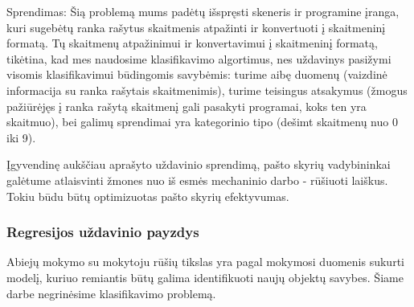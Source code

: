 Sprendimas: Šią problemą mums padėtų išspręsti skeneris ir programine įranga,
kuri sugebėtų ranka rašytus skaitmenis atpažinti ir konvertuoti į skaitmeninį
formatą. Tų skaitmenų atpažinimui ir konvertavimui į skaitmeninį formatą,
tikėtina, kad mes naudosime klasifikavimo algortimus, nes uždavinys pasižymi
visomis klasifikavimui būdingomis savybėmis: turime aibę duomenų (vaizdinė
informacija su ranka rašytais skaitmenimis), turime teisingus atsakymus (žmogus
pažiūrėjęs į ranka rašytą skaitmenį gali pasakyti programai, koks ten yra
skaitmuo), bei galimų sprendimai yra kategorinio tipo (dešimt skaitmenų nuo
0 iki 9).

Įgyvendinę aukščiau aprašyto uždavinio sprendimą, pašto skyrių vadybininkai
galėtume atlaisvinti žmones nuo iš esmės mechaninio darbo - rūšiuoti laiškus.
Tokiu būdu būtų optimizuotas pašto skyrių efektyvumas.

\subsubsection{Regresijos uždavinio payzdys}



Abiejų mokymo su mokytoju rūšių tikslas yra pagal mokymosi duomenis sukurti
modelį, kuriuo remiantis būtų galima identifikuoti naujų objektų
savybes.\cite{markhall99} Šiame darbe negrinėsime klasifikavimo problemą.

